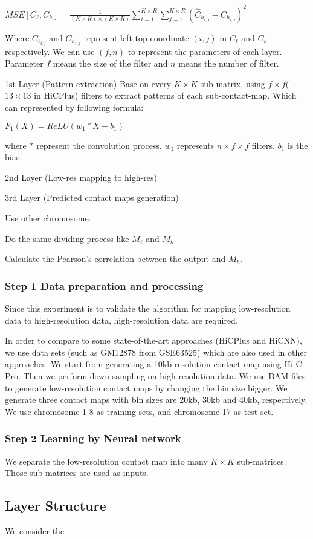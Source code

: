 \documentclass{article}
\begin{document}
\begin{center}
    $MSE[C_\ell, C_h] = \frac{1}{(K \times R)\times (K \times R)} \sum_{i=1}^{K \times R} \sum_{j=1}^{K \times R} (\hat{C}_{h_{i,j}}-C_{h_{i,j}})^2$
\end{center}
Where $C_{\ell_{i,j}}$ and $C_{h_{i,j}}$ represent left-top coordinate $(i,j)$ in $C_\ell$ and $C_h$ respectively.
\noindent We can use $(f,n)$ to represent the parameters of each layer. Parameter $f$ means the size of the filter and $n$ means the number of filter. 

\noindent 1st Layer (Pattern extraction)
Base on every $K \times K$ sub-matrix, using $f \times f$( $13 \times 13$ in HiCPlus) filters
to extract patterns of each sub-contact-map. Which can represented by following formula:
\begin{center}
$F_1(X) = ReLU(w_1 * X + b_1)$
\end{center}
where $*$ represent the convolution process. $w_1$ represents $n \times f \times f$ filters. 
$b_1$ is the bias.
 

\noindent 2nd Layer (Low-res mapping to high-res)

\noindent 3rd Layer (Predicted contact maps generation)


Use other chromosome. 

Do the same dividing process like $M_\ell$ and $M_h$

Calculate the Pearson's correlation between the output and $M_h$.







\subsubsection*{Step 1 Data preparation and processing}
Since this experiment is to validate the algorithm for mapping low-resolution data to high-resolution data, 
high-resolution data are required. 

In order to compare to some state-of-the-art approaches (HiCPlus and HiCNN), 
we use data sets (such as GM12878 from GSE63525) which are also used in other approaches. 
We start from generating a 10kb resolution contact map 
using Hi-C Pro. 
Then we perform down-sampling on high-resolution data. 
We use BAM files to generate low-resolution contact maps by changing the bin size bigger. 
We generate three contact maps with bin sizes are 20kb, 30kb and 40kb, respectively. 
We use chromosome 1-8 as training sets, and chromosome 17 as test set.

\subsubsection*{Step 2 Learning by Neural network}
We separate the low-resolution contact map into many $K \times K$ sub-matrices. 
Those sub-matrices are used as inputs.

\subsection{Layer Structure}
We consider the 





 
\end{document}
